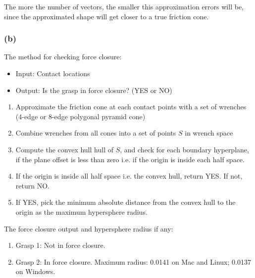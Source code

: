 \documentclass{article}
\theoremstyle{definition} %
\begin{document}
The more the number of vectors, the smaller this approximation errors will be, since the approximated shape will get closer to a true friction cone.

\subsubsection*{(b)}

The method for checking force closure:
\begin{itemize}
	\item Input: Contact locations
	\item Output: Is the grasp in force closure? (YES or NO)
\end{itemize}

\begin{enumerate}
	\item Approximate the friction cone at each contact points with a set of wrenches (4-edge or 8-edge polygonal pyramid cone)
	\item Combine wrenches from all cones into a set of	points $S$ in wrench space
	\item Compute the convex hull hull of $S$, and check for each boundary hyperplane, if the plane offset is less than zero i.e. if the origin is inside each half space.
	\item If the origin is inside all half space i.e. the convex hull, return YES. If not, return NO.
	\item If YES, pick the minimum absolute distance from the convex hull to the origin as the maximum hypersphere radius.
\end{enumerate}


The force closure output and hypersphere radius if any:
\begin{enumerate}
	\item Grasp 1: Not in force closure.
	\item Grasp 2: In force closure. Maximum radius: 0.0141 on Mac and Linux; 0.0137 on Windows\footnotemark{}.
\end{enumerate}

\end{document}

